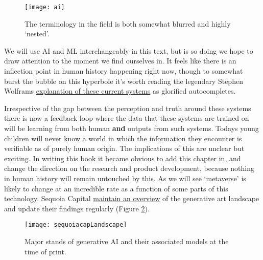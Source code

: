 \begin{figure}[ht]\centering 	\texttt{[image: ai]}
	\caption{The terminology in the field is both somewhat blurred and highly `nested'.}
	\label{fig:aiVenn}
\end{figure}

We will use AI and ML interchangeably in this text, but is so doing we hope to draw attention to the moment we find ourselves in. It feels like there is an inflection point in human history happening right now, though to somewhat burst the bubble on this hyperbole it's worth reading the legendary Stephen Wolframs \href{https://writings.stephenwolfram.com/2023/02/what-is-chatgpt-doing-and-why-does-it-work/}{explanation of these current systems} as glorified autocompletes. \par
Irrespective of the gap between the perception and truth around these systems there is now a feedback loop where the data that these systems are trained on will be learning from both human \textbf{and} outputs from such systems. Todays young children will never know a world in which the information they encounter is verifiable as of purely human origin. The implications of this are unclear but exciting. In writing this book it became obvious to add this chapter in, and change the direction on the research and product development, because nothing in human history will remain untouched by this. As we will see `metaverse' is likely to change at an incredible rate as a function of some parts of this technology. Sequoia Capital \href{https://www.sequoiacap.com/article/generative-ai-a-creative-new-world/}{maintain an overview} of the generative art landscape and update their findings regularly (Figure \ref{fig:sequoiacapLandscape}).
\begin{figure}[ht]\centering 	\texttt{[image: sequoiacapLandscape]}
	\caption{Major stands of generative AI and their associated models at the time of print.}
	\label{fig:sequoiacapLandscape}
\end{figure}
